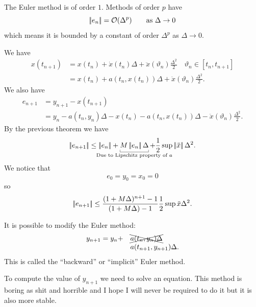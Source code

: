 \documentclass[12pt]{report}
\begin{document}
The Euler method is of order $1$. Methods of order $p$ have
\begin{equation*}
	\left|\negthinspace\left|e_n\right|\negthinspace\right|=\mathcal{O}(\Delta^{p})\qquad\text{as }\Delta\to0
\end{equation*}
which means it is bounded by a constant of order $\Delta^{p}$ as $\Delta\to0$.
\begin{fancyproof}
	We have
	\begin{align*}
		x(t_{n+1})&=x(t_{n})+\dot{x}(t_{n})\Delta+\ddot{x}(\vartheta_n)\frac{\Delta^{2}}{2}\quad\vartheta_n\in[t_{n},t_{n+1}]\\
		&=x(t_{n})+a(t_{n},x(t_{n}))\Delta+\ddot{x}(\vartheta_n)\frac{\Delta^{2}}{2}.
	\end{align*}
	We also have
	\begin{align*}
		e_{n+1}&=y_{n+1}-x(t_{n+1})\\
		&=y_{n}-a(t_{n},y_{n})\Delta-x(t_{n})-a(t_{n},x(t_{n}))\Delta-\ddot{x}(\vartheta_n)\frac{\Delta^{2}}{2}.
	\end{align*}
	By the previous theorem we have
	\begin{equation*}
		\norm{e_{n+1}}\leq\norm{e_n}+\ubracketthin{M\norm{e_n}\Delta}_{\claptext{Due to Lipschitz property of $a$}}+\unmezz\sup\norm{\ddot{x}}\Delta^{2}.
	\end{equation*}
	We notice that
	\begin{equation*}
		e_0=y_0=x_0=0
	\end{equation*}
	so
	\begin{equation*}
		\left|\negthinspace\left|e_{n+1}\right|\negthinspace\right|\leq\frac{(1+M\Delta)^{n+1}-1}{(1+M\Delta)-1}\frac{1}{2}\sup\ddot{x}\Delta^{2}.
	\end{equation*}
\end{fancyproof}
\begin{remark}
	It is possible to modify the Euler method:
	\begin{equation*}
		\begin{array}{rl}
			y_{n+1}=y_{n}+&\xcancel{a(t_{n},y_{n})\Delta}\\
			&a(t_{n+1},y_{n+1})\Delta.
		\end{array}
	\end{equation*}
	This is called the ``backward'' or ``implicit'' Euler method.
\end{remark}
To compute the value of $y_{n+1}$ we need to solve an equation. This method is boring as shit and horrible and I hope I will never be required to do it but it is also more stable.
\end{document}
